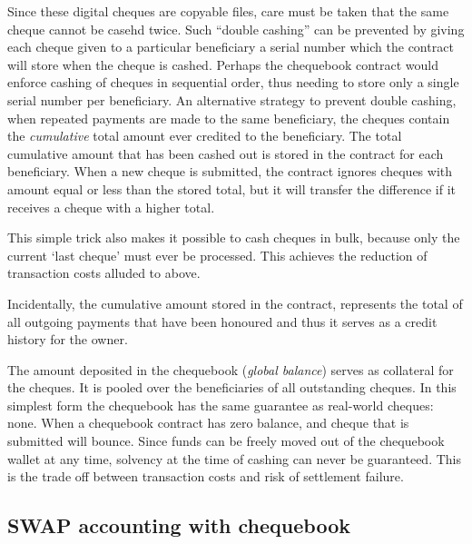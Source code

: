 \documentclass[a4paper,10pt]{article}
\newcommand\gloss[1]{\emph{\gls{#1}}}
\begin{document}
Since these digital cheques are copyable files, care must be taken that the same cheque cannot be casehd twice. Such ``double cashing'' can be prevented by giving each cheque given to a particular beneficiary a serial number which the contract will store when the cheque is cashed. Perhaps the chequebook contract would enforce cashing of cheques in sequential order, thus needing to store only a single serial number per beneficiary.
An alternative strategy to prevent double cashing, when repeated payments are made to the same beneficiary, the cheques contain the \emph{cumulative} total amount ever credited to the beneficiary. The total cumulative amount that has been cashed out is stored in the contract for each beneficiary. When a new cheque is submitted, the contract ignores cheques with amount equal or less than the stored total, but it will transfer the difference if it receives a cheque with a higher
total.

This simple trick also makes it possible to cash cheques in bulk, because only the current `last cheque' must ever be processed. This achieves the reduction of transaction costs alluded to above.

Incidentally, the cumulative amount stored in the contract, represents the total of all outgoing payments that have been honoured and thus it serves as a credit history for the owner.

The amount deposited in the chequebook (\gloss{global balance}) serves as collateral for the cheques. It is pooled over the beneficiaries of all outstanding cheques.
In this simplest form the chequebook has the same guarantee as real-world cheques: none. When a chequebook contract has zero balance, and cheque that is submitted will bounce. Since funds can be freely moved out of the chequebook wallet at any time, solvency at the time of cashing can never be guaranteed. This is the trade off between transaction costs and risk of settlement failure.


\subsection{SWAP accounting with chequebook}
\end{document}
